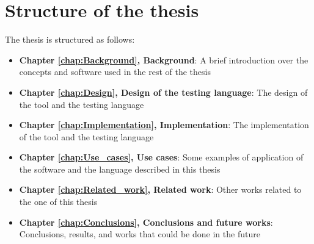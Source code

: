 \section{Structure of the thesis}
The thesis is structured as follows:
\begin{itemize}
    \item \textbf{Chapter \ref{chap:Background}, Background}: A brief introduction over the concepts and software used in the rest of the thesis
    \item \textbf{Chapter \ref{chap:Design}, Design of the testing language}: The design of the tool and the testing language
    \item \textbf{Chapter \ref{chap:Implementation}, Implementation}: The implementation of the tool and the testing language
    \item \textbf{Chapter \ref{chap:Use_cases}, Use cases}: Some examples of application of the software and the language described in this thesis
    \item \textbf{Chapter \ref{chap:Related_work}, Related work}: Other works related to the one of this thesis
    \item \textbf{Chapter \ref{chap:Conclusions}, Conclusions and future works}: Conclusions, results, and works that could be done in the future
\end{itemize}




